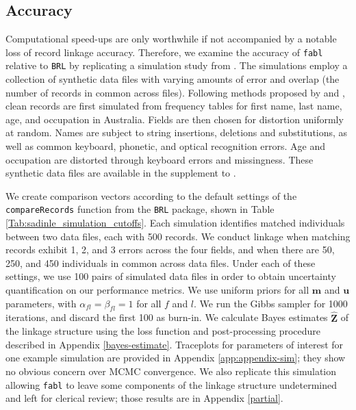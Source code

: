 \documentclass[ba]{imsart}
\begin{document}
	
	\hypertarget{accuracy}{%
		\subsection{Accuracy}\label{accuracy}}
	
	Computational speed-ups are only worthwhile if not accompanied by a notable loss of record linkage accuracy. Therefore, we examine the accuracy of \texttt{fabl} relative to \texttt{BRL} by replicating a simulation study from \cite{sadinle_bayesian_2017}. The simulations employ a collection of synthetic data files with varying amounts of error and overlap (the number of records in common across files). Following methods proposed by \cite{christen_pudjijono2009} and \cite{christen_vatsalan2013}, clean records are first simulated from frequency tables for first name, last name, age, and occupation in Australia. Fields are then chosen for distortion uniformly at random. Names are subject to string insertions, deletions and substitutions, as well as common keyboard, phonetic, and optical recognition errors. Age and occupation are distorted through keyboard errors and missingness. These synthetic data files are available in the supplement to \cite{sadinle_bayesian_2017}.
	
	We create comparison vectors according to the default settings of the \texttt{compareRecords} function from the \texttt{BRL} package, shown in Table \ref{Tab:sadinle_simulation_cutoffs}. Each simulation identifies matched individuals between two data files, each with 500 records. We conduct linkage when matching records exhibit 1, 2, and 3 errors across the four fields, and when there are 50, 250, and 450 individuals in common across data files. Under each of these settings, we use 100 pairs of simulated data files in order to obtain uncertainty quantification on our performance metrics. We use uniform priors for all $\bm{m}$ and $\bm{u}$ parameters, with $\alpha_{fl} = \beta_{fl} = 1$ for all $f$ and $l$. We run the Gibbs sampler for 1000 iterations, and discard the first 100 as burn-in. We calculate Bayes estimates $\hat{\bm{Z}}$ of the linkage structure using the  loss function and post-processing procedure described in Appendix \ref{bayes-estimate}. Traceplots for parameters of interest for one example simulation are provided in Appendix \ref{app:appendix-sim}; they show no obvious concern over MCMC convergence. We also replicate this simulation allowing \texttt{fabl} to leave some components of the linkage structure undetermined and left for clerical review; those results are in Appendix \ref{partial}.
	
\end{document}
